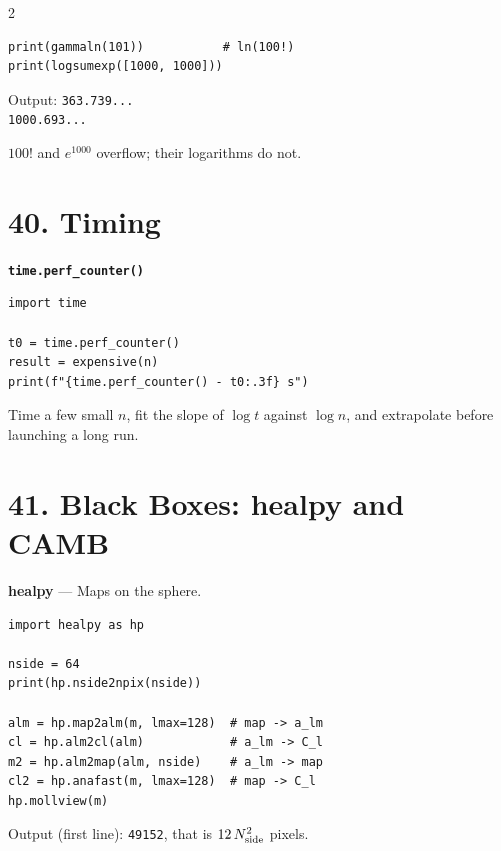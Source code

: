 \documentclass[10pt,a4paper]{article}
\begin{document}
\begin{multicols}{2}
\begin{card}
\begin{lstlisting}[style=pythonstyle]
print(gammaln(101))           # ln(100!)
print(logsumexp([1000, 1000]))
\end{lstlisting}

Output:
\texttt{363.739...}\\
\texttt{1000.693...}

$100!$ and $e^{1000}$ overflow; their logarithms do not.
\end{card}

\section*{40. Timing}

\begin{card}
\textbf{\texttt{time.perf\_counter()}}

\begin{lstlisting}[style=pythonstyle]
import time

t0 = time.perf_counter()
result = expensive(n)
print(f"{time.perf_counter() - t0:.3f} s")
\end{lstlisting}

Time a few small $n$, fit the slope of $\log t$ against $\log n$, and
extrapolate before launching a long run.
\end{card}

\section*{41. Black Boxes: healpy and CAMB}

\begin{card}
\textbf{healpy} --- Maps on the sphere.

\begin{lstlisting}[style=pythonstyle]
import healpy as hp

nside = 64
print(hp.nside2npix(nside))

alm = hp.map2alm(m, lmax=128)  # map -> a_lm
cl = hp.alm2cl(alm)            # a_lm -> C_l
m2 = hp.alm2map(alm, nside)    # a_lm -> map
cl2 = hp.anafast(m, lmax=128)  # map -> C_l
hp.mollview(m)
\end{lstlisting}

Output (first line): \texttt{49152}, that is $12\,N_{\rm side}^2$ pixels.
\end{card}


\end{multicols}
\end{document}
